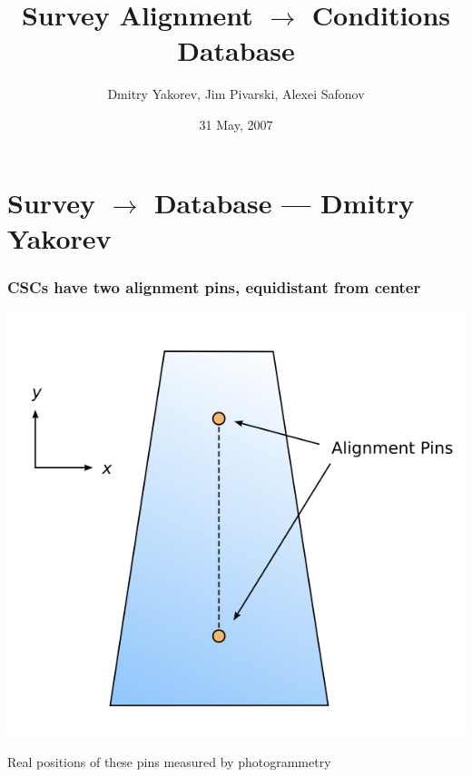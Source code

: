 \documentclass[compress]{beamer}
\title{Survey Alignment $\to$ Conditions Database}
\author{Dmitry Yakorev, Jim Pivarski, Alexei Safonov}
\institute{Texas A\&M University}
\date{31 May, 2007}
\begin{document}
\frame{\titlepage}
\section*{Survey $\to$ Database --- Dmitry Yakorev}

\begin{frame}
\frametitle{CSCs have two alignment pins, equidistant from center}

\vspace{-0.75 cm}
\begin{center}
\includegraphics[width=0.65\linewidth]{pins.png}
\end{center}

\vspace{-0.5 cm}
Real positions of these pins measured by photogrammetry
\end{frame}
\end{document}
